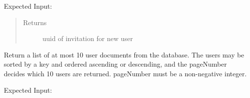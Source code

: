 \documentclass[letterpaper,10pt,english]{sphinxmanual}
\begin{document}
\begin{fulllineitems}
\begin{fulllineitems}
Expected Input:

\begin{sphinxVerbatim}[commandchars=\\\{\}]
         
     
     
     
     
     
     
\end{sphinxVerbatim}
\begin{quote}\begin{description}
\item[{Returns}] \leavevmode
uuid of invitation for new user

\end{description}\end{quote}

\end{fulllineitems}


\begin{fulllineitems}
\label{\detokenize{apidoc/utdesign_procurement:utdesign_procurement.apigateway.ApiGateway.userData}}
Return a list of at most 10 user documents from the database. The users may be
sorted by a key and ordered ascending or descending, and the pageNumber
decides which 10 users are returned. pageNumber must be a non-negative integer.

Expected Input:


\end{fulllineitems}
\end{fulllineitems}
\end{document}
